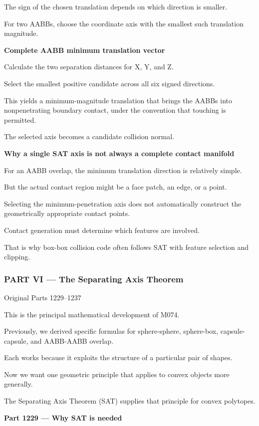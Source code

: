 The sign of the chosen translation depends on which direction is smaller.

For two AABBs, choose the coordinate axis with the smallest such translation magnitude.

\textbf{Complete AABB minimum translation vector}

Calculate the two separation distances for X, Y, and Z.

Select the smallest positive candidate across all six signed directions.

This yields a minimum-magnitude translation that brings the AABBs into nonpenetrating boundary contact, under the convention that touching is permitted.

The selected axis becomes a candidate collision normal.

\textbf{Why a single SAT axis is not always a complete contact manifold}

For an AABB overlap, the minimum translation direction is relatively simple.

But the actual contact region might be a face patch, an edge, or a point.

Selecting the minimum-penetration axis does not automatically construct the geometrically appropriate contact points.

Contact generation must determine which features are involved.

That is why box-box collision code often follows SAT with feature selection and clipping.

\subsubsection{PART VI --- The Separating Axis Theorem}\label{part-vi-the-separating-axis-theorem}

Original Parts 1229--1237

This is the principal mathematical development of M074.

Previously, we derived specific formulas for sphere-sphere, sphere-box, capsule-capsule, and AABB-AABB overlap.

Each works because it exploits the structure of a particular pair of shapes.

Now we want one geometric principle that applies to convex objects more generally.

The Separating Axis Theorem (SAT) supplies that principle for convex polytopes.

\textbf{Part 1229 --- Why SAT is needed}

